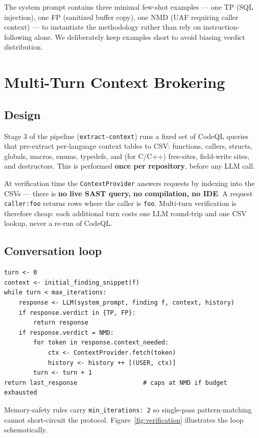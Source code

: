 \documentclass[11pt,a4paper]{article}
\begin{document}
The system prompt contains three minimal few-shot examples --- one TP
(SQL injection), one FP (sanitized buffer copy), one NMD (UAF requiring
caller context) --- to instantiate the methodology rather than rely on
instruction-following alone. We deliberately keep examples short to
avoid biasing verdict distribution.

\section{Multi-Turn Context Brokering}
\label{sec:broker}

\subsection{Design}

Stage 3 of the pipeline (\texttt{extract-context}) runs a fixed set of
CodeQL queries that pre-extract per-language context tables to CSV:
functions, callers, structs, globals, macros, enums, typedefs, and
(for C/C++) free-sites, field-write sites, and destructors. This is
performed \textbf{once per repository}, before any LLM call.

At verification time the \texttt{ContextProvider} answers requests by
indexing into the CSVs --- there is \textbf{no live SAST query, no
compilation, no IDE}. A request \texttt{caller:foo} returns rows where
the caller is \texttt{foo}. Multi-turn verification is therefore cheap:
each additional turn costs one LLM round-trip and one CSV lookup,
never a re-run of CodeQL.

\subsection{Conversation loop}

\begin{lstlisting}[language={}]
turn <- 0
context <- initial_finding_snippet(f)
while turn < max_iterations:
    response <- LLM(system_prompt, finding f, context, history)
    if response.verdict in {TP, FP}:
        return response
    if response.verdict = NMD:
        for token in response.context_needed:
            ctx <- ContextProvider.fetch(token)
            history <- history ++ [(USER, ctx)]
        turn <- turn + 1
return last_response                  # caps at NMD if budget exhausted
\end{lstlisting}

Memory-safety rules carry \texttt{min\_iterations: 2} so single-pass
pattern-matching cannot short-circuit the protocol.
Figure~\ref{fig:verification} illustrates the loop schematically.
\end{document}
